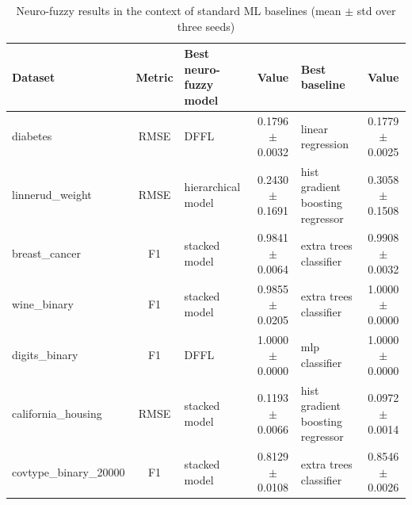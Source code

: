 \documentclass[runningheads]{llncs}
\begin{document}
\begin{table}[H]
\centering
\caption{Neuro-fuzzy results in the context of standard ML baselines (mean $\pm$ std over three seeds)}
\label{tab:best_vs_baseline}
\scriptsize
\setlength{\tabcolsep}{3pt}
\begin{tabular}{lclclc}
\toprule
Dataset & Metric & Best neuro-fuzzy model & Value & Best baseline & Value \\
\midrule
diabetes               & RMSE & DFFL               & 0.1796$\pm$0.0032 & linear regression                 & 0.1779$\pm$0.0025 \\
linnerud\_weight       & RMSE & hierarchical model & 0.2430$\pm$0.1691 & hist gradient boosting regressor & 0.3058$\pm$0.1508 \\
breast\_cancer         & F1   & stacked model      & 0.9841$\pm$0.0064 & extra trees classifier           & 0.9908$\pm$0.0032 \\
wine\_binary           & F1   & stacked model      & 0.9855$\pm$0.0205 & extra trees classifier           & 1.0000$\pm$0.0000 \\
digits\_binary         & F1   & DFFL               & 1.0000$\pm$0.0000 & mlp classifier                   & 1.0000$\pm$0.0000 \\
california\_housing    & RMSE & stacked model      & 0.1193$\pm$0.0066 & hist gradient boosting regressor & 0.0972$\pm$0.0014 \\
covtype\_binary\_20000 & F1   & stacked model      & 0.8129$\pm$0.0108 & extra trees classifier           & 0.8546$\pm$0.0026 \\
\bottomrule
\end{tabular}
\end{table}
\end{document}
